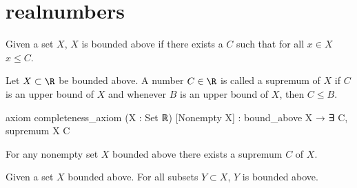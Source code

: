 \chapter{realnumbers}\label{cha:realnums}

\begin{definition}\label{def:boundabove}
  \leanok
  Given a set $X$,
  $X$ is bounded above if there exists a $C$ such that for all $x \in X$ $x \leq C$.
\end{definition}

\begin{definition}[Supremum]\label{def:supremum}
  \leanok
  Let $X \subset \R$ be bounded above.
  A number $C \in \R$ is called a supremum of $X$ if $C$ is an upper bound of $X$ and whenever $B$ is an upper bound of $X$,
  then $C \leq B$.
\end{definition}

axiom completeness_axiom (X : Set ℝ) [Nonempty X] : bound_above X → ∃ C, supremum X C
\begin{axiom}\label{ax:complax}
  \leanok
  For any nonempty set $X$ bounded above there exists a supremum $C$ of $X$.
\end{axiom}

\begin{lemma}
  \label{lem:subsetboundbounded}
  \leanok
  Given a set $X$ bounded above.
  For all subsets $Y \subset X$,
  $Y$ is bounded above.
\end{lemma}


